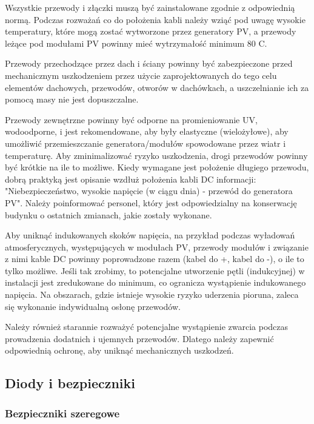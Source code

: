 \documentclass[12pt,a4paper]{article}
\begin{document}
Wszystkie przewody i złączki muszą być zainstalowane zgodnie z 
odpowiednią normą. Podczas rozważań co do położenia kabli należy wziąć 
pod uwagę wysokie temperatury, które mogą zostać wytworzone przez 
generatory PV, a przewody leżące pod modułami PV powinny mieć 
wytrzymałość minimum 80 \degree C. 

Przewody przechodzące przez dach i ściany powinny być zabezpieczone 
przed mechanicznym uszkodzeniem przez użycie zaprojektowanych do tego 
celu elementów dachowych, przewodów, otworów w dachówkach, a 
uszczelnianie ich za pomocą masy nie jest dopuszczalne. 

Przewody zewnętrzne powinny być odporne na promieniowanie UV, 
wodoodporne, i jest rekomendowane, aby były elastyczne (wielożyłowe), 
aby umożliwić przemieszczanie generatora/modułów spowodowane przez wiatr 
i temperaturę. Aby zminimalizować ryzyko uszkodzenia, drogi przewodów powinny być krótkie na ile to możliwe. 
Kiedy wymagane jest położenie długiego przewodu, dobrą praktyką jest 
opisanie wzdłuż położenia kabli DC informacji: "Niebezpieczeństwo, 
wysokie napięcie (w ciągu dnia) - przewód do generatora PV". Należy 
poinformować personel, który jest odpowiedzialny na konserwację budynku 
o ostatnich zmianach, jakie zostały wykonane. 

Aby uniknąć indukowanych skoków napięcia, na przykład podczas wyładowań 
atmosferycznych, występujących w modułach PV, przewody modułów i 
związanie z nimi kable DC powinny poprowadzone razem (kabel do +, kabel 
do -), o ile to tylko możliwe. Jeśli tak zrobimy, to potencjalne 
utworzenie pętli (indukcyjnej) w instalacji jest zredukowane do minimum, 
co ogranicza wystąpienie indukowanego napięcia. Na obszarach, gdzie 
istnieje wysokie ryzyko uderzenia pioruna, zaleca się wykonanie 
indywidualną osłonę przewodów. 

Należy również starannie rozważyć potencjalne wystąpienie zwarcia 
podczas prowadzenia dodatnich i ujemnych przewodów. Dlatego należy 
zapewnić odpowiednią ochronę, aby uniknąć mechanicznych uszkodzeń. 

\subsection{Diody i bezpieczniki}
 
\subsubsection{Bezpieczniki szeregowe}
\end{document}
